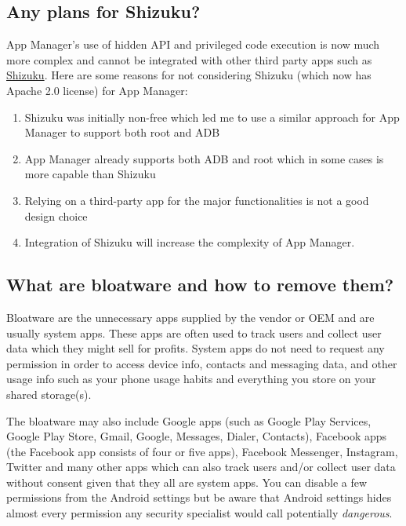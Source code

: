 \subsection{Any plans for Shizuku?}
App Manager's use of hidden API and privileged code execution is now much more complex and cannot be integrated with
other third party apps such as \href{https://shizuku.rikka.app}{Shizuku}. Here are some reasons for not considering
Shizuku (which now has Apache 2.0 license) for App Manager:
\begin{enumerate}
    \item Shizuku was initially non-free which led me to use a similar approach for App Manager to support both root
    and ADB
    \item App Manager already supports both ADB and root which in some cases is more capable than Shizuku
    \item Relying on a third-party app for the major functionalities is not a good design choice
    \item Integration of Shizuku will increase the complexity of App Manager.
\end{enumerate}

\subsection{What are bloatware and how to remove them?}\label{subsec:faq:what-are-bloatware}
Bloatware are the unnecessary apps supplied by the vendor or OEM and are usually system apps. These apps are often used
to track users and collect user data which they might sell for profits. System apps do not need to request any
permission in order to access device info, contacts and messaging data, and other usage info such as your phone usage
habits and everything you store on your shared storage(s).

The bloatware may also include Google apps (such as Google Play Services, Google Play Store, Gmail, Google, Messages,
Dialer, Contacts), Facebook apps (the Facebook app consists of four or five apps), Facebook Messenger, Instagram,
Twitter and many other apps which can also track users and/or collect user data without consent given that they all are
system apps. You can disable a few permissions from the Android settings but be aware that Android settings hides almost
every permission any security specialist would call potentially \emph{dangerous}.

